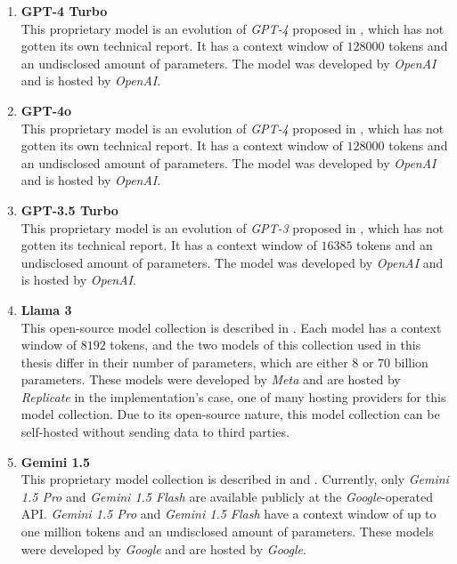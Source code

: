 \documentclass[draft,final]{thesisclass} %
\begin{document}
\begin{enumerate}
    \item \textbf{GPT-4 Turbo}\\
    This proprietary model \parencite{gpt4_turbo}is an evolution of \textit{GPT-4} proposed in \textcite{gpt4}, which has not gotten its own technical report. It has a context window of $128000$ tokens and an undisclosed amount of parameters.
    The model was developed by \textit{OpenAI} and is hosted by \textit{OpenAI}.
    \item \textbf{GPT-4o}\\
    This proprietary model \parencite{gpt4o} is an evolution of \textit{GPT-4} proposed in \textcite{gpt4}, which has not gotten its own technical report. It has a context window of $128000$ tokens and an undisclosed amount of parameters.
    The model was developed by \textit{OpenAI} and is hosted by \textit{OpenAI}.
    \item \textbf{GPT-3.5 Turbo}\\
    This proprietary model is an evolution of \textit{GPT-3} proposed in \textcite{gpt3}, which has not gotten its technical report. It has a context window of $16385$ tokens and an undisclosed amount of parameters.
    The model was developed by \textit{OpenAI} and is hosted by \textit{OpenAI}.
    \item \textbf{Llama 3}\\
    This open-source model collection is described in \textcite{llama3}. Each model has a context window of $8192$ tokens, and the two models of this collection used in this thesis differ in their number of parameters, which are either $8$ or $70$ billion parameters.
    These models were developed by \textit{Meta} and are hosted by \textit{Replicate} in the implementation's case, one of many hosting providers for this model collection.
    Due to its open-source nature, this model collection can be self-hosted without sending data to third parties.
    \item \textbf{Gemini 1.5}\\
    This proprietary model collection is described in \textcite{gemini_1.5} and \textcite{gemini_flash}. Currently, only \textit{Gemini 1.5 Pro} and \textit{Gemini 1.5 Flash} are available publicly at the \textit{Google}-operated API. \textit{Gemini 1.5 Pro} and \textit{Gemini 1.5 Flash} have a context window of up to one million tokens and an undisclosed amount of parameters. These models were developed by \textit{Google} and are hosted by \textit{Google}.
\end{enumerate}
\end{document}
